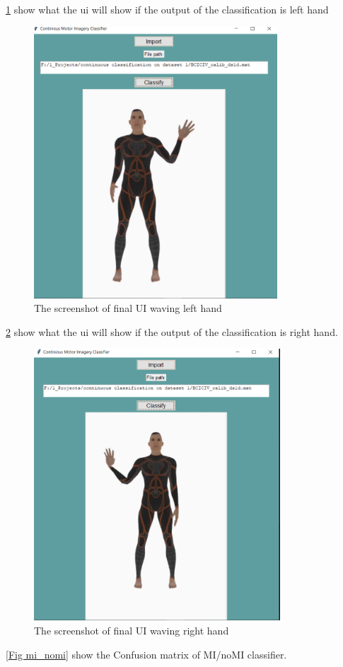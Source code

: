 \documentclass[12pt,a4paper]{report}
\begin{document}
	\justify \ref{Fig wave_left} show what the ui will show if the output of the classification is left hand
		\begin{figure}[h]
		\centering 
		
		\includegraphics[height =4in]{1 (4).PNG}
		\caption{ The screenshot of final UI waving left hand}
		\label{Fig wave_left}
		\end{figure}
\justify \ref{Fig wave_right} show what the ui will show if the output of the classification is right hand.
		\begin{figure}[h]
	\centering 
	
	\includegraphics[height =4in]{1 (6).PNG}
	\caption{ The screenshot of final UI waving right hand}
	\label{Fig wave_right}
	\end{figure}
\justify \ref{Fig mi_nomi} show the Confusion matrix of MI/noMI classifier.
\end{document}
